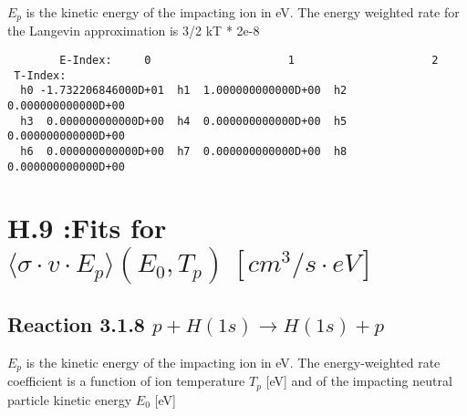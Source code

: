 \documentclass[12pt,dvipdfmx]{article}
\begin{document}
$E_p$ is the kinetic energy of the impacting ion in eV.
The energy weighted rate for the Langevin approximation is
3/2 kT * 2e-8

\begin{small}\begin{verbatim}
        E-Index:     0                     1                     2
 T-Index:
  h0 -1.732206846000D+01  h1  1.000000000000D+00  h2  0.000000000000D+00
  h3  0.000000000000D+00  h4  0.000000000000D+00  h5  0.000000000000D+00
  h6  0.000000000000D+00  h7  0.000000000000D+00  h8  0.000000000000D+00

\end{verbatim}\end{small}

\section{H.9 :Fits for $\langle\sigma \cdot v \cdot E_p \rangle (E_0,T_p) \ [cm^3/s
\cdot eV]$}

\subsection{
Reaction 3.1.8   $p + H(1s)  \rightarrow  H(1s) + p $
}
$E_p$ is the kinetic energy of the impacting ion in eV.
The energy-weighted rate coefficient is a function of ion temperature $T_p$
[eV]  and of the impacting neutral particle kinetic energy $E_0$ [eV]
\end{document}
